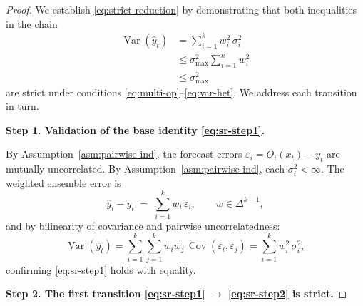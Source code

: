 \documentclass[12pt,openany]{book}
\numberwithin{equation}{chapter}
\theoremstyle{plain}
\theoremstyle{definition}
\theoremstyle{remark}
\numberwithin{equation}{chapter}
\theoremstyle{plain}
\DeclareMathOperator{\Var}{Var}
\DeclareMathOperator{\Cov}{Cov}
\begin{document}
\begin{proof}
We establish \eqref{eq:strict-reduction} by demonstrating that both
inequalities in the chain
\begin{align}
  \Var(\hat{y}_t)
    &= \sum_{i=1}^{k} w_i^2\,\sigma_i^2
    \label{eq:sr-step1} \\
    &\leq \sigma_{\max}^2 \sum_{i=1}^{k} w_i^2
    \label{eq:sr-step2} \\
    &\leq \sigma_{\max}^2
    \label{eq:sr-step3}
\end{align}
are strict under conditions \eqref{eq:multi-op}--\eqref{eq:var-het}.
We address each transition in turn.

\medskip
\noindent\textbf{Step 1. Validation of the base identity \eqref{eq:sr-step1}.}

\noindent By Assumption~\ref{asm:pairwise-ind}, the forecast errors
$\varepsilon_i = O_i(x_t) - y_t$ are mutually uncorrelated.
By Assumption~\ref{asm:pairwise-ind}, each $\sigma_i^2 < \infty$.
The weighted ensemble error is
\begin{equation}
  \hat{y}_t - y_t
    \;=\; \sum_{i=1}^{k} w_i\,\varepsilon_i,
    \qquad w \in \Delta^{k-1},
\end{equation}
and by bilinearity of covariance and pairwise uncorrelatedness:
\begin{equation}
  \Var(\hat{y}_t)
    = \sum_{i=1}^{k}\sum_{j=1}^{k} w_i w_j\,\Cov(\varepsilon_i,\varepsilon_j)
    = \sum_{i=1}^{k} w_i^2\,\sigma_i^2,
\end{equation}
confirming \eqref{eq:sr-step1} holds with equality.

\medskip
\noindent\textbf{Step 2. The first transition \eqref{eq:sr-step1}
  $\to$ \eqref{eq:sr-step2} is strict.}


\end{proof}
\end{document}

